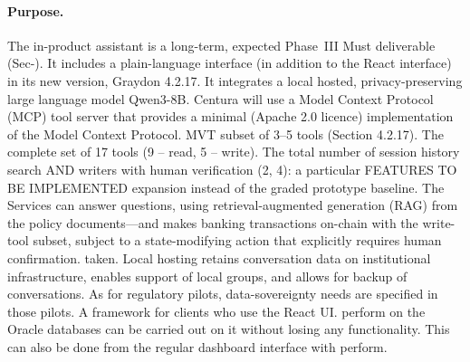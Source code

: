 \documentclass[12pt,a4paper]{article}
\begin{document}
\paragraph{Purpose.}
The in-product assistant is a long-term, expected Phase~III Must deliverable (Sec-). It includes a plain-language interface (in addition to the React interface) in its new version, Graydon 4.2.17. It integrates a local hosted, privacy-preserving large language model Qwen3-8B. Centura will use a Model Context Protocol (MCP) tool server that provides a minimal (Apache 2.0 licence) implementation of the Model Context Protocol. MVT subset of 3--5 tools (Section 4.2.17). The complete set of 17 tools (9 -- read, 5 -- write). The total number of session history search AND writers with human verification (2, 4): a particular FEATURES TO BE IMPLEMENTED expansion instead of the graded prototype baseline. The Services can answer questions, using retrieval-augmented generation (RAG) from the policy documents---and makes banking transactions on-chain with the write-tool subset, subject to a state-modifying action that explicitly requires human confirmation. taken. Local hosting retains conversation data on institutional infrastructure, enables support of local groups, and allows for backup of conversations. As for regulatory pilots, data-sovereignty needs are specified in those pilots. A framework for clients who use the React UI. perform on the Oracle databases can be carried out on it without losing any functionality. This can also be done from the regular dashboard interface with perform.
\end{document}
